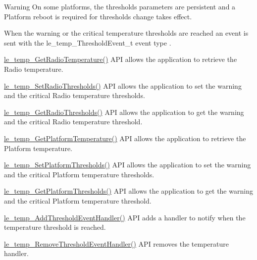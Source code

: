 \begin{DoxyWarning}{Warning}
On some platforms, the thresholds parameters are persistent and a Platform reboot is required for thresholds change takes effect.
\end{DoxyWarning}
When the warning or the critical temperature thresholds are reached an event is sent with the {\ttfamily le\+\_\+temp\+\_\+\+Threshold\+Event\+\_\+t} event type .


\begin{DoxyItemize}
\item \hyperlink{le__temp__interface_8h_af02a78a861bb30c2b17049da34b30409}{le\+\_\+temp\+\_\+\+Get\+Radio\+Temperature()} A\+P\+I allows the application to retrieve the Radio temperature.
\item \hyperlink{le__temp__interface_8h_a476e20b815d3df88ff00ebe1fab42792}{le\+\_\+temp\+\_\+\+Set\+Radio\+Thresholds()} A\+P\+I allows the application to set the warning and the critical Radio temperature thresholds.
\item \hyperlink{le__temp__interface_8h_a275ce92a6ed5376a978b5be5687f6cd1}{le\+\_\+temp\+\_\+\+Get\+Radio\+Thresholds()} A\+P\+I allows the application to get the warning and the critical Radio temperature threshold.
\item \hyperlink{le__temp__interface_8h_ad5a5d27181c71928e3b8a5a0476e8b08}{le\+\_\+temp\+\_\+\+Get\+Platform\+Temperature()} A\+P\+I allows the application to retrieve the Platform temperature.
\item \hyperlink{le__temp__interface_8h_aea0cace31c93751db6d48be522e073b8}{le\+\_\+temp\+\_\+\+Set\+Platform\+Thresholds()} A\+P\+I allows the application to set the warning and the critical Platform temperature thresholds.
\item \hyperlink{le__temp__interface_8h_a00a364d667662c110b51fa1475dcc39f}{le\+\_\+temp\+\_\+\+Get\+Platform\+Thresholds()} A\+P\+I allows the application to get the warning and the critical Platform temperature threshold.
\item \hyperlink{le__temp__interface_8h_acb2ef2d56777133835b843a786103268}{le\+\_\+temp\+\_\+\+Add\+Threshold\+Event\+Handler()} A\+P\+I adds a handler to notify when the temperature threshold is reached.
\item \hyperlink{le__temp__interface_8h_a29fa7d59baed8a6ee058e32e2cddbd74}{le\+\_\+temp\+\_\+\+Remove\+Threshold\+Event\+Handler()} A\+P\+I removes the temperature handler.
\end{DoxyItemize}





